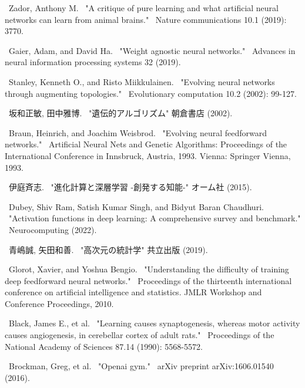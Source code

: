 \begin{thebibliography}{99}
     \
    Zador, Anthony M. \
    "A critique of pure learning and what artificial neural networks can learn from animal brains." \
    Nature communications 10.1 (2019): 3770.
    
    \bibitem{WANN} \
    Gaier, Adam, and David Ha. \
    "Weight agnostic neural networks." \
    Advances in neural information processing systems 32 (2019).

     \
    Stanley, Kenneth O., and Risto Miikkulainen. \
    "Evolving neural networks through augmenting topologies." \
    Evolutionary computation 10.2 (2002): 99-127.

    \bibitem{遺伝的アルゴリズム} \
    坂和正敏, 田中雅博. \
    "遺伝的アルゴリズム" 朝倉書店 (2002).
    
    \bibitem{NE} \
    Braun, Heinrich, and Joachim Weisbrod. \
    "Evolving neural feedforward networks." \
    Artificial Neural Nets and Genetic Algorithms: Proceedings of the International Conference in Innsbruck, Austria, 1993. Vienna: Springer Vienna, 1993.

    \bibitem{深層学習} \
    伊庭斉志. \
    "進化計算と深層学習 -創発する知能-" オーム社 (2015). 

    \bibitem{活性化関数} \
    Dubey, Shiv Ram, Satish Kumar Singh, and Bidyut Baran Chaudhuri. \
    "Activation functions in deep learning: A comprehensive survey and benchmark." \
    Neurocomputing (2022).

     \
    青嶋誠, 矢田和善. \
    "高次元の統計学" 共立出版 (2019).

     \
    Glorot, Xavier, and Yoshua Bengio. \
    "Understanding the difficulty of training deep feedforward neural networks." \
    Proceedings of the thirteenth international conference on artificial intelligence and statistics. JMLR Workshop and Conference Proceedings, 2010.

     \
    Black, James E., et al. \
    "Learning causes synaptogenesis, whereas motor activity causes angiogenesis, in cerebellar cortex of adult rats." \
    Proceedings of the National Academy of Sciences 87.14 (1990): 5568-5572.

    \bibitem{OpenAI} \
    Brockman, Greg, et al. \
    "Openai gym." \
    arXiv preprint arXiv:1606.01540 (2016).
\end{thebibliography}